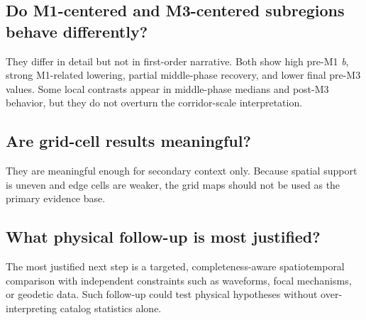\documentclass[11pt]{article}
\begin{document}
\subsection*{Do M1-centered and M3-centered subregions behave differently?}
They differ in detail but not in first-order narrative. Both show high pre-M1 \textit{b}, strong M1-related lowering, partial middle-phase recovery, and lower final pre-M3 values. Some local contrasts appear in middle-phase medians and post-M3 behavior, but they do not overturn the corridor-scale interpretation.

\subsection*{Are grid-cell results meaningful?}
They are meaningful enough for secondary context only. Because spatial support is uneven and edge cells are weaker, the grid maps should not be used as the primary evidence base.

\subsection*{What physical follow-up is most justified?}
The most justified next step is a targeted, completeness-aware spatiotemporal comparison with independent constraints such as waveforms, focal mechanisms, or geodetic data. Such follow-up could test physical hypotheses without over-interpreting catalog statistics alone.
\end{document}
